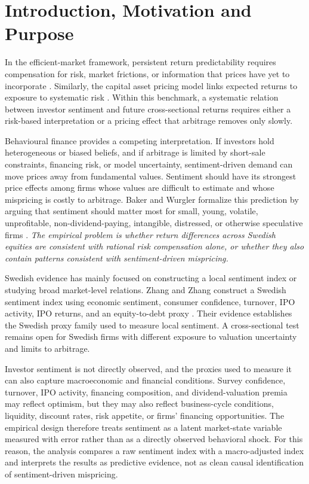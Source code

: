 \documentclass[11pt]{article}
\begin{document}
\section{Introduction, Motivation and Purpose}
In the efficient-market framework, persistent return predictability requires compensation for risk, market frictions, or information that prices have yet to incorporate \citep{fama1970efficient,fama1991efficient}. Similarly, the capital asset pricing model links expected returns to exposure to systematic risk \citep{sharpe1964capital}. Within this benchmark, a systematic relation between investor sentiment and future cross-sectional returns requires either a risk-based interpretation or a pricing effect that arbitrage removes only slowly.

Behavioural finance provides a competing interpretation. If investors hold heterogeneous or biased beliefs, and if arbitrage is limited by short-sale constraints, financing risk, or model uncertainty, sentiment-driven demand can move prices away from fundamental values. Sentiment should have its strongest price effects among firms whose values are difficult to estimate and whose mispricing is costly to arbitrage. Baker and Wurgler formalize this prediction by arguing that sentiment should matter most for small, young, volatile, unprofitable, non-dividend-paying, intangible, distressed, or otherwise speculative firms \citep{baker2006sentiment,baker2007}. \textit{The empirical problem is whether return differences across Swedish equities are consistent with rational risk compensation alone, or whether they also contain patterns consistent with sentiment-driven mispricing.}

Swedish evidence has mainly focused on constructing a local sentiment index or studying broad market-level relations. Zhang and Zhang construct a Swedish sentiment index using economic sentiment, consumer confidence, turnover, IPO activity, IPO returns, and an equity-to-debt proxy \citep{zhang2023sweden}. Their evidence establishes the Swedish proxy family used to measure local sentiment. A cross-sectional test remains open for Swedish firms with different exposure to valuation uncertainty and limits to arbitrage.

Investor sentiment is not directly observed, and the proxies used to measure it can also capture macroeconomic and financial conditions. Survey confidence, turnover, IPO activity, financing composition, and dividend-valuation premia may reflect optimism, but they may also reflect business-cycle conditions, liquidity, discount rates, risk appetite, or firms' financing opportunities. The empirical design therefore treats sentiment as a latent market-state variable measured with error rather than as a directly observed behavioral shock. For this reason, the analysis compares a raw sentiment index with a macro-adjusted index and interprets the results as predictive evidence, not as clean causal identification of sentiment-driven mispricing.
\end{document}
